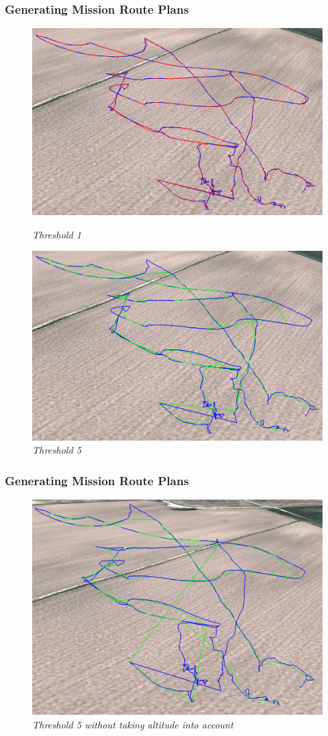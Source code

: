 \documentclass[10pt, compress]{beamer}
\begin{document}
\begin{frame}[fragile]
	\frametitle{Generating Mission Route Plans}
\begin{figure}
\centering
\begin{minipage}{.5\textwidth}
	\centering
	\includegraphics[width=1\linewidth]{Figures/Paths_threshold_1_w_alt}
	\caption{\textit{Threshold 1}}
	\label{fig:thresh1}
\end{minipage}%
\begin{minipage}{.5\textwidth}
	\centering
	\includegraphics[width=1\linewidth]{Figures/Paths_threshold_5_w_alt}
	\caption{\textit{Threshold 5}}
	\label{fig:thresh5}
\end{minipage}
\end{figure}
\end{frame}

\begin{frame}
	\frametitle{Generating Mission Route Plans}
\begin{figure}
  \centering
 \includegraphics[width=.6\textwidth]{Figures/Paths_threshold_5}
 	\caption{\textit{Threshold 5 without taking altitude into account}}
	\label{fig:thresh5}
\end{figure}
\end{frame}

\end{document}
